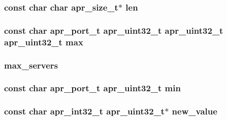 \subsubsection[{\texorpdfstring{len}{len}}]{ const char char {\bf apr\+\_\+size\+\_\+t}$\ast$ len}\hypertarget{group__APR__Util__RC_gaec3bbc8c406590287ccd8d9613df4f8d}{}\label{group__APR__Util__RC_gaec3bbc8c406590287ccd8d9613df4f8d}
\subsubsection[{\texorpdfstring{max}{max}}]{\setlength{\rightskip}{0pt plus 5cm}const char {\bf apr\+\_\+port\+\_\+t} {\bf apr\+\_\+uint32\+\_\+t} {\bf apr\+\_\+uint32\+\_\+t} {\bf apr\+\_\+uint32\+\_\+t} max}\hypertarget{group__APR__Util__RC_ga38e7d1fc94ad8c6709d5b2243d2fd94b}{}\label{group__APR__Util__RC_ga38e7d1fc94ad8c6709d5b2243d2fd94b}
\subsubsection[{\texorpdfstring{max\+\_\+servers}{max_servers}}]{ max\+\_\+servers}\hypertarget{group__APR__Util__RC_ga6d125da079a6df3cd41060e74d7b8616}{}\label{group__APR__Util__RC_ga6d125da079a6df3cd41060e74d7b8616}
\subsubsection[{\texorpdfstring{min}{min}}]{\setlength{\rightskip}{0pt plus 5cm}const char {\bf apr\+\_\+port\+\_\+t} {\bf apr\+\_\+uint32\+\_\+t} min}\hypertarget{group__APR__Util__RC_gaed1ae724c786d088e40b9e6667e4e039}{}\label{group__APR__Util__RC_gaed1ae724c786d088e40b9e6667e4e039}
\subsubsection[{\texorpdfstring{new\+\_\+value}{new_value}}]{\setlength{\rightskip}{0pt plus 5cm}const char {\bf apr\+\_\+int32\+\_\+t} {\bf apr\+\_\+uint32\+\_\+t}$\ast$ new\+\_\+value}\hypertarget{group__APR__Util__RC_ga6da6ffe4e1ccb7d07da0409bc5a2728b}{}\label{group__APR__Util__RC_ga6da6ffe4e1ccb7d07da0409bc5a2728b}
